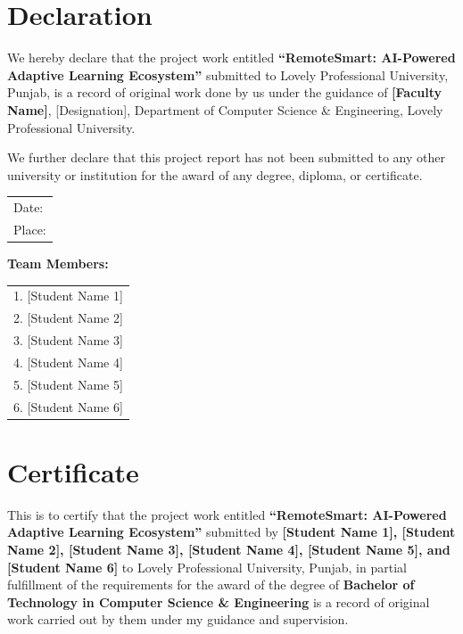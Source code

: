 \documentclass[12pt,a4paper]{report}
\begin{document}
\chapter*{Declaration}

We hereby declare that the project work entitled \textbf{``RemoteSmart: AI-Powered Adaptive Learning Ecosystem''} submitted to Lovely Professional University, Punjab, is a record of original work done by us under the guidance of \textbf{[Faculty Name]}, [Designation], Department of Computer Science \& Engineering, Lovely Professional University.

We further declare that this project report has not been submitted to any other university or institution for the award of any degree, diploma, or certificate.

\vspace{2cm}

\begin{flushright}
\begin{tabular}{l}
Date: \hrulefill \\
Place: \hrulefill
\end{tabular}
\end{flushright}

\vspace{1cm}

\begin{flushleft}
\textbf{Team Members:}
\end{flushleft}

\begin{tabular}{l}
1. [Student Name 1] \\
2. [Student Name 2] \\
3. [Student Name 3] \\
4. [Student Name 4] \\
5. [Student Name 5] \\
6. [Student Name 6]
\end{tabular}

\newpage
\chapter*{Certificate}

This is to certify that the project work entitled \textbf{``RemoteSmart: AI-Powered Adaptive Learning Ecosystem''} submitted by \textbf{[Student Name 1], [Student Name 2], [Student Name 3], [Student Name 4], [Student Name 5], and [Student Name 6]} to Lovely Professional University, Punjab, in partial fulfillment of the requirements for the award of the degree of \textbf{Bachelor of Technology in Computer Science \& Engineering} is a record of original work carried out by them under my guidance and supervision.
\end{document}
